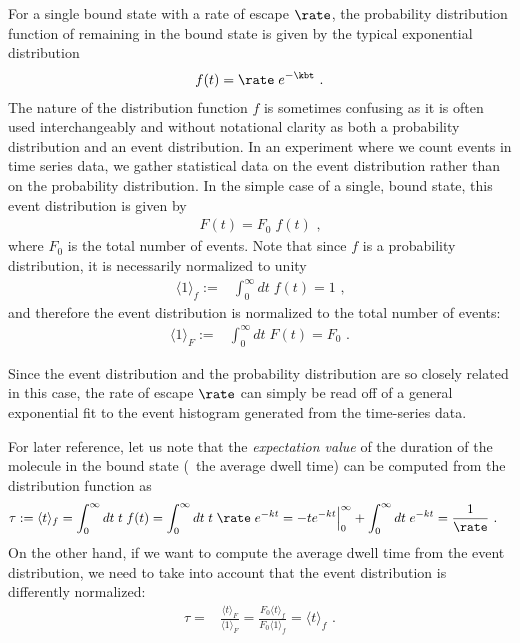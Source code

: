 For a single bound state with a rate of escape $\rate$, the probability distribution function of remaining in
the bound state is given by the typical exponential distribution
%
\begin{align*}
    f(t) = \rate \; e^{-\kbt}
    \text{ .}
\end{align*}
%
The nature of the distribution function $f$ is sometimes confusing as it is often used interchangeably and
without notational clarity as both a probability distribution and an event distribution. In an experiment
where we count events in time series data, we gather statistical data on the event distribution rather than on
the probability distribution. In the simple case of a single, bound state, this event distribution is given by
%
\begin{align}\label{eq:event_distri}
    F(t) = F_0 \;f(t)
    \text{ ,}
\end{align}
%
where $F_0$ is the total number of events. Note that since $f$ is a probability distribution, it is
necessarily normalized to unity
%
\begin{align}
    \langle 1\rangle_f :={}& \int_0^\infty dt\;f(t) = 1
    \text{ ,}
\end{align}
%
and therefore the event distribution is normalized to the total number of events:
%
\begin{align}\label{eq:normalization}
    \langle 1\rangle_F :={}& \int_0^\infty dt\;F(t) = F_0
    \text{ .}
\end{align}
%

Since the event distribution and the probability distribution are so closely related in this case, the rate of
escape $\rate$ can simply be read off of a general exponential fit to the event histogram generated from the
time-series data.

For later reference, let us note that the \emph{expectation value} of the duration of the molecule in the
bound state (\ie~the average dwell time) can be computed from the distribution function as
%
\begin{align*}
    \tau :={}& \langle t\rangle_f
    = \int_0^\infty dt\; t\; f(t)
    = \int_0^\infty dt\; t\;\rate\; e^{-kt}
    = - t e^{-kt}\Big|_{0}^\infty + \int_0^\infty dt \;e^{-kt}
    = \frac{1}{\rate}
    \text{ .}
\end{align*}
%
On the other hand, if we want to compute the average dwell time from the event distribution, we need to take
into account that the event distribution is differently normalized:
%
\begin{align}\label{eq:event_distri_norm}
    \tau ={}& \frac{\langle t\rangle_F}{\langle 1\rangle_F}
    = \frac{F_0\langle t\rangle_f}{F_0\langle 1\rangle_f}
    = \langle t\rangle_f
    \text{ .}
\end{align}
%

